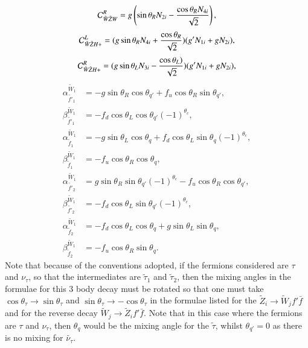 \documentclass[final,3p,times]{elsarticle}
\begin{document}
\begin{equation}
\mathcal{C}_{\tilde{W} \tilde{Z} W}^R = g\left(\sin\theta_R N_{2i} - {\cos\theta_R N_{4i} \over \sqrt{2}}\right),
\end{equation}
\begin{equation}
\mathcal{C}_{\tilde{W} \tilde{Z} H+}^L = (g\sin\theta_R N_{4i} + {\cos\theta_R \over \sqrt{2}})(g' N_{1i} + g N_{2i}),
\end{equation}
\begin{equation}
\mathcal{C}_{\tilde{W} \tilde{Z} H+}^R = (g\sin\theta_L N_{3i} - {\cos\theta_L) \over \sqrt{2}})(g' N_{1i} + g N_{2i}),
\end{equation}
\begin{align}
\alpha_{\tilde{f'}_1}^{\tilde{W}_1} &= -g \sin\theta_R \cos\theta_{q'} + f_{u}\cos\theta_{R}\sin\theta_{q'}, \\
\beta_{\tilde{f'}_1}^{\tilde{W}_1} &= -f_{d}\cos\theta_L \cos\theta_{q'} (-1)^{\theta_c}, \\
\alpha_{\tilde{f}_1}^{\tilde{W}_1} &= -g\sin\theta_L \cos\theta_q + f_{d}\cos\theta_L \sin\theta_q(-1)^{\theta_c}, \\
\beta_{\tilde{f}_1}^{\tilde{W}_1} &= -f_{u}\cos\theta_R \cos\theta_q, \\
\alpha_{\tilde{f'}_2}^{\tilde{W}_1} &= g\sin\theta_R \sin\theta_{q'}(-1)^{\theta_c} - f_{u}\cos\theta_R \cos\theta_{q'}, \\
\beta_{\tilde{f'}_2}^{\tilde{W}_1} &= -f_{d}\cos\theta_L \sin\theta_{q'}(-1)^{\theta_c}, \\
\alpha_{\tilde{f}_2}^{\tilde{W}_1} &= -f_{d}\cos\theta_{L}\cos\theta_{q} + g\sin\theta_{L}\sin\theta_{q}, \\
\beta_{\tilde{f}_2}^{\tilde{W}_1} &= -f_{u}\cos\theta_R\sin\theta_{q}.
\end{align}
Note that because of the conventions adopted, if the fermions considered are $\tau$ and $\nu_{\tau}$, so that the intermediates are $\tilde{\tau}_1$ and $\tilde{\tau}_2$, then the mixing angles in the formulae for this 3 body	 decay must be rotated so that one must take $\cos\theta_{\tau} \rightarrow \sin\theta_{\tau}$ and $\sin\theta_{\tau} \rightarrow -\cos\theta_{\tau}$ in the formulae listed for the $\tilde{Z}_i \rightarrow \tilde{W}_j  f' \bar{f}$ and for the reverse decay $\tilde{W}_j \rightarrow \tilde{Z}_i  f' \bar{f}$. Note that in this case where the fermions are $\tau$ and $\nu_{\tau}$, then $\theta_q$ would be the mixing angle for the $\tilde{\tau}$, whilst $\theta_{q'} = 0$ as there is no mixing for $\tilde{\nu_{\tau}}$.
\end{document}
